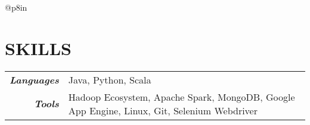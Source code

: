 \documentclass[line,margin]{res}
\begin{document}
\begin{resume}
\begin{tabular}{@{}p{8in}}
\medskip


\section{SKILLS}
\vspace{0.1cm}
\begin{tabular}{rp{13cm}}
{\it\bf Languages}  & Java, Python, Scala \\
{\it\bf Tools}  & Hadoop Ecosystem, Apache Spark, MongoDB, Google App Engine, Linux, Git, Selenium Webdriver\\
\end{tabular}

 
\end{tabular}

\end{resume}
 
\end{document}

